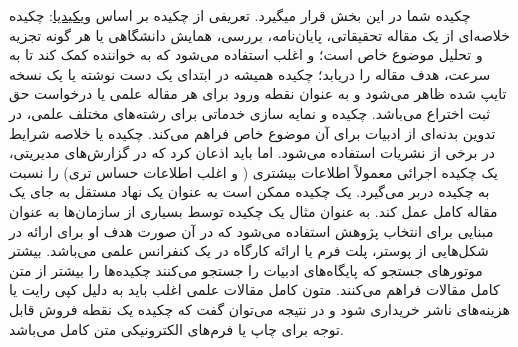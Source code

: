 چکیده شما در این بخش قرار میگیرد. تعریفی از چکیده بر اساس \hyperref{https://fa.wikipedia.org/wiki/%
	چکیده خلاصه‌ای از یک مقاله تحقیقاتی، پایان‌نامه، بررسی، همایش دانشگاهی یا هر گونه تجزیه و تحلیل موضوع خاص است؛ و اغلب استفاده می‌شود که به خواننده کمک کند تا به سرعت، هدف مقاله را دریابد؛ چکیده همیشه در ابتدای یک دست نوشته یا یک نسخه تایپ شده ظاهر می‌شود و به عنوان نقطه ورود برای هر مقاله علمی یا درخواست حق ثبت اختراع می‌باشد. چکیده و نمایه سازی خدماتی برای رشته‌های مختلف علمی، در تدوین بدنه‌ای از ادبیات برای آن موضوع خاص فراهم می‌کند.
	چکیده یا خلاصه شرایط در برخی از نشریات استفاده می‌شود. اما باید اذعان کرد که در گزارش‌های مدیریتی، یک چکیده اجرائی معمولاً اطلاعات بیشتری ( و اغلب اطلاعات حساس تری) را نسبت به چکیده دربر می‌گیرد.
	یک چکیده ممکن است به عنوان یک نهاد مستقل به جای یک مقاله کامل عمل کند. به عنوان مثال یک چکیده توسط بسیاری از سازمان‌ها به عنوان مبنایی برای انتخاب پژوهش استفاده می‌شود که در آن صورت هدف او برای ارائه در شکل‌هایی از پوستر، پلت فرم یا ارائه کارگاه در یک کنفرانس علمی می‌باشد.
	بیشتر موتورهای جستجو که پایگاه‌های ادبیات را جستجو می‌کنند چکیده‌ها را بیشتر از متن کامل مقالات فراهم می‌کنند. متون کامل مقالات علمی اغلب باید به دلیل کپی رایت یا هزینه‌های ناشر خریداری شود و در نتیجه می‌توان گفت که چکیده یک نقطه فروش قابل توجه برای چاپ یا فرم‌های الکترونیکی متن کامل می‌باشد.